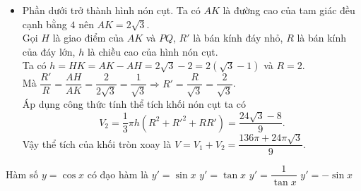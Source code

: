 \begin{ex}
{\begin{itemize}
			\item Phần dưới trở thành hình nón cụt. 
			Ta có $AK$ là đường cao của tam giác đều cạnh bằng $4$ nên $AK=2\sqrt{3}$. \\
		Gọi $H$ là giao điểm của $AK$ và $PQ$, $R'$ là bán kính đáy nhỏ, $R$ là bán kính của đáy lớn, $h$ là chiều cao của hình nón cụt.\\
			Ta có $h= HK = AK - AH = 2\sqrt{3} - 2 = 2 \left( \sqrt{3} - 1 \right)$ và $R = 2$. \\
			Mà $\dfrac{R'}{R} = \dfrac{AH}{AK}=\dfrac{2}{2\sqrt{3}}= \dfrac{1}{\sqrt{3}} \Rightarrow R' = \dfrac{R}{\sqrt{3}} = \dfrac{2}{\sqrt{3}}$.\\
			Áp dụng công thức tính thể tích khối nón cụt ta có $$V_2 = \dfrac{1}{3}\pi h \left( R^2 + R'^2 + RR' \right) = \dfrac{24\sqrt{3} - 8}{9}.$$
			Vậy thể tích của khối tròn xoay là $V= V_1 + V_2 = \dfrac{136 \pi + 24 \pi \sqrt{3}}{9}$.  	
		\end{itemize}
	}
\end{ex}

\begin{ex}%
	Hàm số $y=\cos x$ có đạo hàm là  
	\choice
	{$y' = \sin x$}
	{$y' = \tan x$}
	{$y' = \dfrac{1}{\tan x}$}
	{\True $y' = - \sin x$}
\end{ex}

